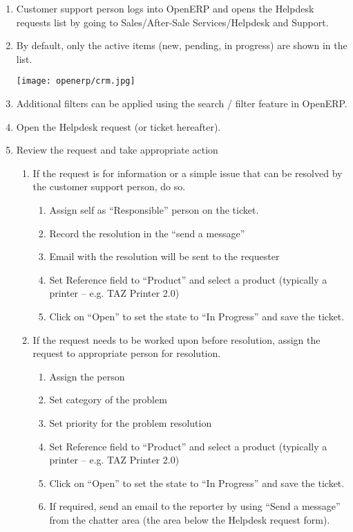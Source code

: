 \begin{enumerate}
\item Customer support person logs into OpenERP and opens the Helpdesk requests list by going to Sales/After-Sale Services/Helpdesk and Support.
\item By default, only the active items (new, pending, in progress) are shown in the list.

  \texttt{[image: openerp/crm.jpg]}
  
\item Additional filters can be applied using the search / filter feature in OpenERP.
\item Open the Helpdesk request (or ticket hereafter).
\item Review the request and take appropriate action
  \begin{enumerate}
  \item If the request is for information or a simple issue that can be resolved by the customer support person, do so.
    \begin{enumerate}
    \item Assign self as “Responsible” person on the ticket.
    \item Record the resolution in the “send a message”
    \item Email with the resolution will be sent to the requester
    \item Set Reference field to “Product” and select a product (typically a printer – e.g. TAZ Printer 2.0)
    \item Click on “Open” to set the state to “In Progress” and save the ticket.
    \end{enumerate}
  \item If the request needs to be worked upon before resolution, assign the request to appropriate person for resolution.
    \begin{enumerate}
    \item Assign the person
    \item Set category of the problem
    \item Set priority for the problem resolution
    \item Set Reference field to “Product” and select a product (typically a printer – e.g. TAZ Printer 2.0)
    \item Click on “Open” to set the state to “In Progress” and save the ticket.
    \item If required, send an email to the reporter by using “Send a message” from the chatter area (the area below the Helpdesk request form).

\end{enumerate}
\end{enumerate}
\end{enumerate}
